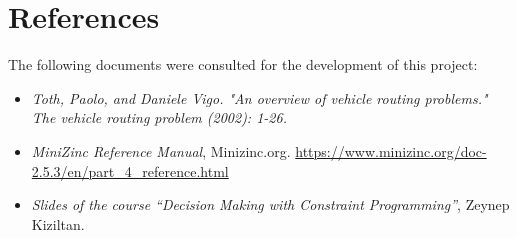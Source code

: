 \documentclass[main.tex]{subfiles}
\begin{document}
\section{References}

The following documents were consulted for the development of this project:
\begin{itemize}
    \item \textit{Toth, Paolo, and Daniele Vigo. "An overview of vehicle routing problems." The vehicle routing problem (2002): 1-26.}
    \item \textit{MiniZinc Reference Manual}, Minizinc.org. \href{https://www.minizinc.org/doc-2.5.3/en/part_4_reference.html}{https://www.minizinc.org/doc-2.5.3/en/part\_4\_reference.html}
    \item \textit{Slides of the course ``Decision Making with Constraint Programming''}, Zeynep Kiziltan.
\end{itemize}
\end{document}
